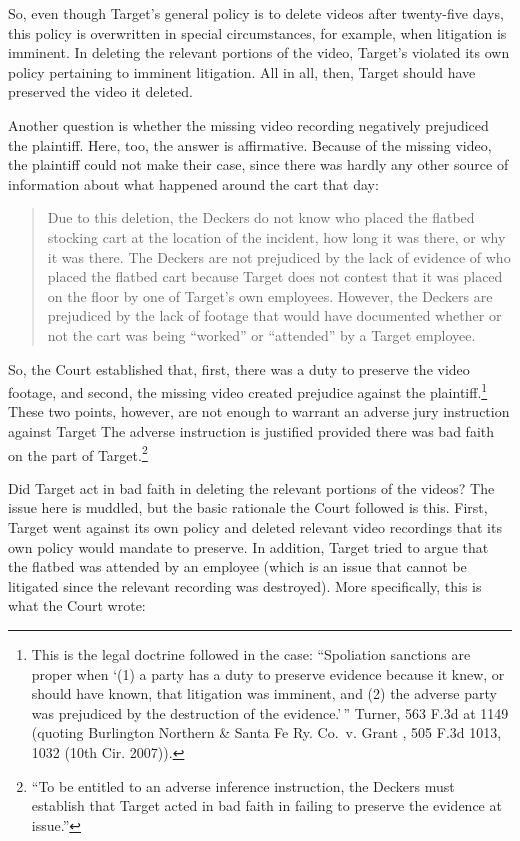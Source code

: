 \documentclass[
  10pt,
  dvipsnames,enabledeprecatedfontcommands]{scrartcl}
\begin{document}
\noindent  So, even though Target's general policy is to delete videos
after twenty-five days, this policy is overwritten in special
circumstances, for example, when litigation is imminent. In deleting the
relevant portions of the video, Target's violated its own policy
pertaining to imminent litigation. All in all, then, Target should have
preserved the video it deleted.

Another question is whether the missing video recording negatively
prejudiced the plaintiff. Here, too, the answer is affirmative. Because
of the missing video, the plaintiff could not make their case, since
there was hardly any other source of information about what happened
around the cart that day:

\begin{quote}
Due to this deletion, the Deckers do not know who placed the flatbed stocking cart at the location of the incident, how long it was there, or why it was there. The Deckers are not prejudiced by the lack of evidence of who placed the flatbed cart because Target does not contest that it was placed on the floor by one of Target’s own employees. However, the Deckers are prejudiced by the lack of footage that would have documented  whether or not the cart was being “worked” or “attended” by a Target employee.
\end{quote}

\noindent So, the Court established that, first, there was a duty to
preserve the video footage, and second, the missing video created
prejudice against the plaintiff.\footnote{This is the legal doctrine
  followed in the case: ``Spoliation sanctions are proper when `(1) a
  party has a duty to preserve evidence because it knew, or should have
  known, that litigation was imminent, and (2) the adverse party was
  prejudiced by the destruction of the evidence.'\,'' Turner, 563 F.3d
  at 1149 (quoting Burlington Northern \& Santa Fe Ry. Co.~v. Grant ,
  505 F.3d 1013, 1032 (10th Cir. 2007)).} These two points, however, are
not enough to warrant an adverse jury instruction against Target The
adverse instruction is justified provided there was bad faith on the
part of Target.\footnote{``To be entitled to an adverse inference
  instruction, the Deckers must establish that Target acted in bad faith
  in failing to preserve the evidence at issue.''}

Did Target act in bad faith in deleting the relevant portions of the
videos? The issue here is muddled, but the basic rationale the Court
followed is this. First, Target went against its own policy and deleted
relevant video recordings that its own policy would mandate to preserve.
In addition, Target tried to argue that the flatbed was attended by an
employee (which is an issue that cannot be litigated since the relevant
recording was destroyed). More specifically, this is what the Court
wrote:
\end{document}
